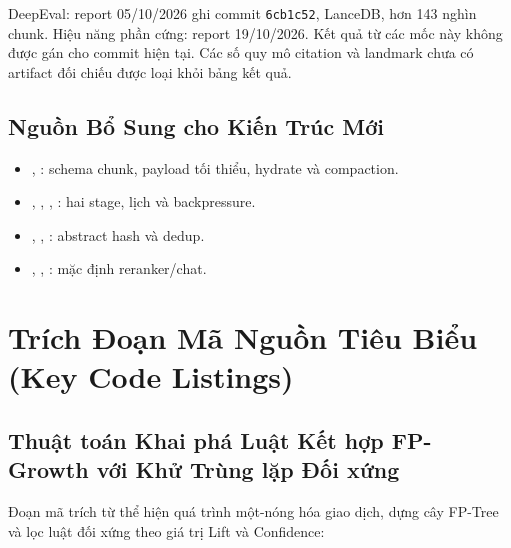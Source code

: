DeepEval: report 05/10/2026 ghi commit \texttt{6cb1c52}, LanceDB, hơn 143 nghìn chunk. Hiệu năng phần cứng: report 19/10/2026. Kết quả từ các mốc này không được gán cho commit hiện tại. Các số quy mô citation và landmark chưa có artifact đối chiếu được loại khỏi bảng kết quả.

\subsection{Nguồn Bổ Sung cho Kiến Trúc Mới}
\begin{itemize}
\item {}, : schema chunk, payload tối thiểu, hydrate và compaction.
\item {}, , , : hai stage, lịch và backpressure.
\item {}, , : abstract hash và dedup.
\item {}, , : mặc định reranker/chat.
\end{itemize}

\section{Trích Đoạn Mã Nguồn Tiêu Biểu (Key Code Listings)}

\subsection{Thuật toán Khai phá Luật Kết hợp FP-Growth với Khử Trùng lặp Đối xứng}
Đoạn mã trích từ  thể hiện quá trình một-nóng hóa giao dịch, dựng cây FP-Tree và lọc luật đối xứng theo giá trị Lift và Confidence:

